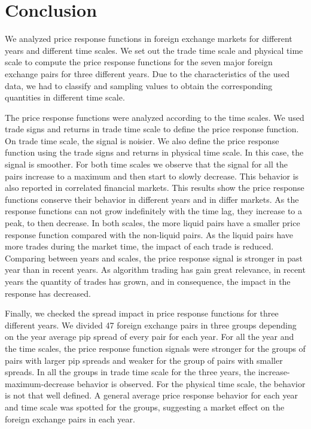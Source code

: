 \section{Conclusion}\label{sec:conclusion}

We analyzed price response functions in foreign exchange markets for different
years and different time scales. We set out the trade time scale and physical
time scale to compute the price response functions for the seven major foreign
exchange pairs for three different years. Due to the characteristics of the
used data, we had to classify and sampling values to obtain the corresponding
quantities in different time scale.

The price response functions were analyzed according to the time scales. We
used trade signs and returns in trade time scale to define the price response
function. On trade time scale, the signal is noisier.
We also define the price response function using the trade signs and returns in
physical time scale. In this case, the signal is smoother. For both time scales
we observe that the signal for all the pairs increase to a maximum and then
start to slowly decrease. This behavior is also reported in correlated
financial markets. This results show the price response functions conserve
their behavior in different years and in differ markets. As the response
functions can not grow indefinitely with the time lag, they increase to a peak,
to then decrease. In both scales, the more liquid pairs have a smaller price
response function compared with the non-liquid pairs. As the liquid pairs have
more trades during the market time, the impact of each trade is reduced.
Comparing between years and scales, the price response signal is stronger in
past year than in recent years. As algorithm trading has gain great relevance,
in recent years the quantity of trades has grown, and in consequence, the
impact in the response has decreased.

Finally, we checked the spread impact in price response functions for three
different years. We divided 47 foreign exchange pairs in three groups depending
on the year average pip spread of every pair for each year. For all the year
and the time scales, the price response function signals were stronger for the
groups of pairs with larger pip spreads and weaker for the group of pairs with
smaller spreads. In all the groups in trade time scale for the three years, the
increase-maximum-decrease behavior is observed. For the physical time scale,
the behavior is not that well defined. A general average price response
behavior for each year and time scale was spotted for the groups, suggesting a
market effect on the foreign exchange pairs in each year.